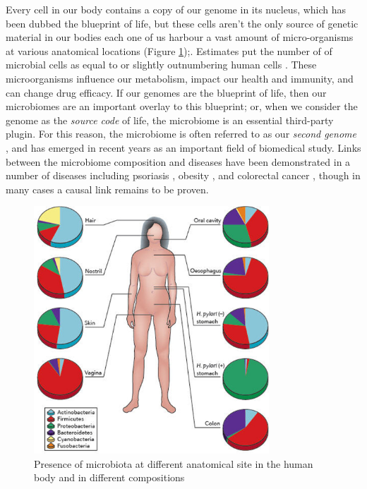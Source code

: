 \begin{justify}
Every cell in our body contains a copy of our genome in its nucleus, which has been dubbed the blueprint of life, but these cells aren't the only source of genetic material in our bodies each one of us harbour a vast amount of micro-organisms at various anatomical locations (Figure \ref{fig:microbiome});. Estimates put the number of of microbial cells as equal to or slightly outnumbering human cells \cite{sender2016outnumbered}. These microorganisms influence our metabolism, impact our health and immunity, and can change drug efficacy. If our genomes are the blueprint of life, then our microbiomes are an important overlay to this blueprint; or, when we consider the genome as the \emph{source code} of life, the microbiome is an essential third-party plugin. For this reason, the microbiome is often referred to as our \emph{second genome} \cite{grice2012microbiome}, and has emerged in recent years as an important field of biomedical study. Links between the microbiome composition and diseases have been demonstrated in a number of diseases \cite{cho2012human} including psoriasis \cite{gao2008substantial}, obesity \cite{turnbaugh2006obesity, ley2005obesity}, and colorectal cancer \cite{castellarin2012fusobacterium,kostic2012genomic}, though in many cases a causal link remains to be proven.

\begin{figure}[h!]
    \centering
    \includegraphics[width=250pt]{chapters/images/mycrobiota/microbiome.jpg}
    \caption{Presence of microbiota at different anatomical site in the human body and in different compositions}
    \label{fig:microbiome}
\end{figure}


\end{justify}
